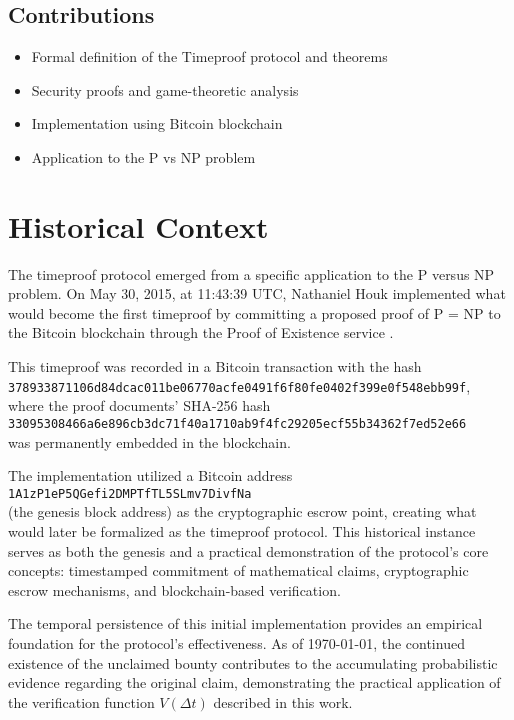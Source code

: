 \documentclass[12pt]{report}
\begin{document}
\subsection{Contributions}
\begin{itemize}
    \item Formal definition of the Timeproof protocol and theorems
    \item Security proofs and game-theoretic analysis
    \item Implementation using Bitcoin blockchain
    \item Application to the P vs NP problem
\end{itemize}

\section{Historical Context}

The timeproof protocol emerged from a specific application to the P versus NP problem. On May 30, 2015, at 11:43:39 UTC, Nathaniel Houk implemented what would become the first timeproof by committing a proposed proof of P = NP to the Bitcoin blockchain through the Proof of Existence service \cite{proofofexistence}.

This timeproof was recorded in a Bitcoin transaction with the hash\\
\texttt{378933871106d84dcac011be06770acfe0491f6f80fe0402f399e0f548ebb99f},\\
where the proof documents' SHA-256 hash\\
\texttt{33095308466a6e896cb3dc71f40a1710ab9f4fc29205ecf55b34362f7ed52e66}\\
was permanently embedded in the blockchain.

The implementation utilized a Bitcoin address\\
\texttt{1A1zP1eP5QGefi2DMPTfTL5SLmv7DivfNa}\\
(the genesis block address) as the cryptographic escrow point, creating what would later be formalized as the timeproof protocol. This historical instance serves as both the genesis and a practical demonstration of the protocol's core concepts: timestamped commitment of mathematical claims, cryptographic escrow mechanisms, and blockchain-based verification.

The temporal persistence of this initial implementation provides an empirical foundation for the protocol's effectiveness. As of \today, the continued existence of the unclaimed bounty contributes to the accumulating probabilistic evidence regarding the original claim, demonstrating the practical application of the verification function \( V(\Delta t) \) described in this work.
\end{document}
